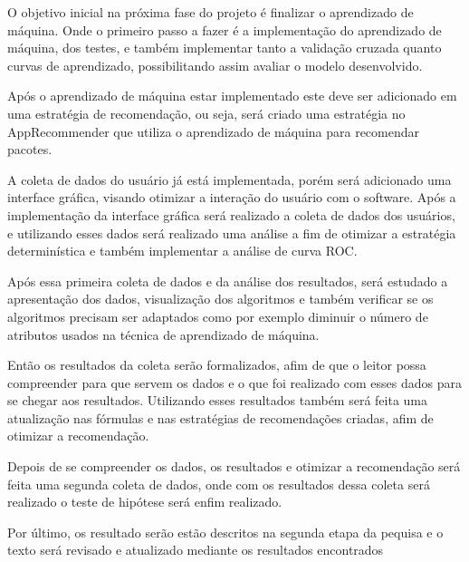 \begin{table}[h]
\centering
{}
\caption{Atividades a serem realizadas}
\label{tab:atividades_futuras}
\end{table}

O objetivo inicial na próxima fase do projeto é finalizar o aprendizado
de máquina. Onde o primeiro passo a fazer é a implementação do aprendizado
de máquina, dos testes, e também implementar tanto a validação cruzada quanto
curvas de aprendizado, possibilitando assim avaliar o modelo desenvolvido.

Após o aprendizado de máquina estar implementado este deve ser adicionado
em uma estratégia de recomendação, ou seja, será criado uma estratégia
no AppRecommender que utiliza o aprendizado de máquina para recomendar
pacotes.

A coleta de dados do usuário já está implementada, porém será adicionado
uma interface gráfica, visando otimizar a interação do usuário com o
software. Após a implementação da interface gráfica será realizado a
coleta de dados dos usuários, e utilizando esses dados será realizado
uma análise a fim de otimizar a estratégia determinística e também
implementar a análise de curva ROC.

Após essa primeira coleta de dados e da análise dos resultados, será
estudado a apresentação dos dados, visualização dos algoritmos e também
verificar se os algoritmos precisam ser adaptados como por exemplo
diminuir o número de atributos usados na técnica de aprendizado de máquina.

Então os resultados da coleta serão formalizados, afim de que o leitor
possa compreender para que servem os dados e o que foi realizado com esses
dados para se chegar aos resultados. Utilizando esses resultados também
será feita uma atualização nas fórmulas e nas estratégias de recomendações
criadas, afim de otimizar a recomendação.

Depois de se compreender os dados, os resultados e otimizar a recomendação
será feita uma segunda coleta de dados, onde com os resultados dessa coleta
será realizado o teste de hipótese será enfim realizado.

Por último, os resultado serão estão descritos na segunda etapa da pequisa e o
texto será revisado e atualizado mediante os resultados encontrados

